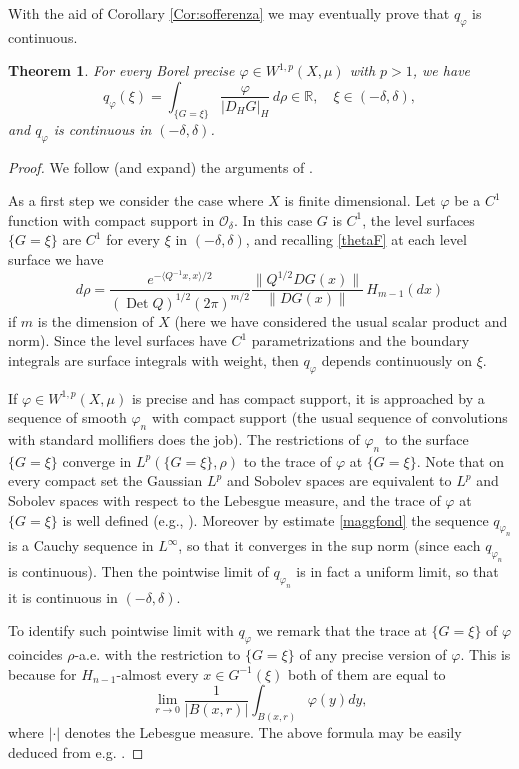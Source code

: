 \documentclass[reqno,twoside,12pt]{amsart}
\newtheorem{Theorem}{Theorem}[section]
\begin{document}
With the aid of Corollary \ref{Cor:sofferenza} we may eventually prove that $q_{\varphi}$ is continuous. 
  

\begin{Theorem}
\label{cont}
For every Borel precise  $\varphi \in W^{1,p}(X, \mu)$ with $p>1$, we have  
$$q_{\varphi}(\xi)= \int_{\{G=\xi\}} \frac{\varphi}{|D_HG|_H}\,d\rho \in {\mathbb R}, \quad \xi\in (-\delta, \delta),$$
and $q_{\varphi}$ is continuous  in $(-\delta, \delta)$. 
\end{Theorem}
\begin{proof}
We follow (and expand) the arguments of \cite{Feyel}. 

\vspace{3mm}
 As a  first  step we consider the case where $X$ is finite dimensional. Let  $\varphi$ be a $C^1$ function with compact support in ${\mathcal O}_{\delta}$. In this case $G$ is $C^1$, the level surfaces  $\{ G=\xi \}$ are $C^1$ for every  $\xi$ in $(-\delta, \delta)$, and recalling \eqref{thetaF} at each level surface we have
$$d\rho = \frac{e^{-\langle Q^{-1}x, x\rangle/2}}{ ({\operatorname{Det}} Q)^{1/2}(2\pi)^{m/2}} \frac{\|Q^{1/2}DG(x)\|}{\|DG(x)\|}\,H_{m-1}(dx)$$
if $m$ is the dimension of $X$ (here we have considered the usual scalar product and norm). Since the level surfaces have $C^1$ parametrizations and  the boundary integrals are surface integrals with  weight, then $q_{\varphi}$ depends continuously on  $\xi$. 

If  $\varphi \in W^{1,p}(X, \mu)$ is precise and has compact support,  
it is approached by a sequence of smooth $\varphi_n$ with compact support (the usual sequence of convolutions with standard mollifiers does the job). The restrictions of $\varphi_n $ to the surface $\{ G=\xi \}$ converge in $L^p(\{G=\xi\}, \rho)$ to the trace of $\varphi  $ at $\{ G=\xi \}$. Note that on every compact set the Gaussian $L^p$ and Sobolev spaces are equivalent to $L^p$ and Sobolev spaces with respect to the Lebesgue measure, and the trace of $\varphi$ at $\{G=\xi\}$ is well defined (e.g., \cite[Sect. 4.3]{EG}). Moreover by estimate  \eqref{maggfond} the sequence $q_{\varphi_n}$ is a Cauchy sequence in $L^{\infty}$, so that it converges in the sup norm (since each $q_{\varphi_n}$ is continuous). Then the  pointwise limit  of $q_{\varphi_n}$ is in fact a uniform limit, so that it is continuous in  $(-\delta, \delta)$. 

To identify such pointwise limit with $q_{\varphi}$ we remark that the trace at $\{G=\xi\}$ of $\varphi $ 
 coincides $\rho$-a.e. with the restriction to $\{G=\xi\}$ of any precise version of $\varphi$. This is because for $H_{n-1}$-almost every $x\in G^{-1}(\xi)$ both of them are equal to 
$$\lim_{r\to 0} \frac{1}{|B(x, r)| } \int_{B(x,r)}\varphi(y)dy,  $$
where $|\cdot |$ denotes the Lebesgue measure. The above formula may be easily deduced from e.g. \cite[Sect. 5.3]{EG}. 
 

\end{proof}
\end{document}

